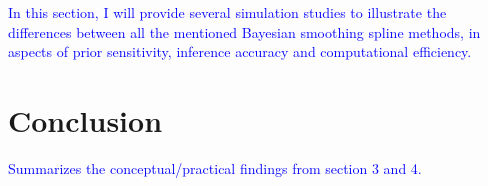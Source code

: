 \documentclass{article}
\newcommand{\ziang}{\textcolor{blue}}
\begin{document}
\ziang{In this section, I will provide several simulation studies to illustrate the differences between all the mentioned Bayesian smoothing spline methods, in aspects of prior sensitivity, inference accuracy and computational efficiency.}






\section{Conclusion}\label{conclusion}
\ziang{Summarizes the conceptual/practical findings from section 3 and 4.}

\newpage


\end{document}
